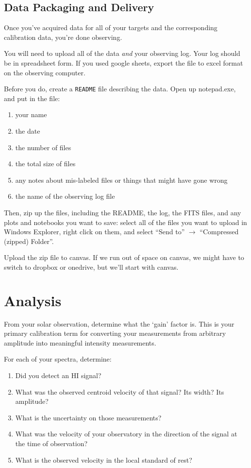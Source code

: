 \documentclass[11pt]{article}
\begin{document}
\subsection{Data Packaging and Delivery}
Once you've acquired data for all of your targets and the corresponding calibration data, you're done observing.

You will need to upload all of the data \emph{and} your observing log.
Your log should be in spreadsheet form.  If you used
google sheets, export the file to excel format on the observing computer.

Before you do, create a \texttt{README} file describing the data.  Open up notepad.exe,
and put in the file:
\begin{enumerate}
    \item your name
    \item the date
    \item the number of files
    \item the total size of files
    \item any notes about mis-labeled files or things that might have gone wrong
    \item the name of the observing log file
\end{enumerate}

Then, zip up the files, including the README, the log, the FITS files, and any plots
and notebooks you want to save:
select all of the files you want to upload in Windows Explorer, right click on
them, and select ``Send to'' $\rightarrow$ ``Compressed (zipped) Folder''.

Upload the zip file to canvas.  If we run out of space on canvas, we might have
to switch to dropbox or onedrive, but we'll start with canvas.


\section{Analysis}

From your solar observation, determine what the `gain' factor is.  This is your primary
calibration term for converting your measurements from arbitrary amplitude into meaningful
intensity measurements.

For each of your spectra, determine:
\begin{enumerate}
    \item Did you detect an HI signal?
    \item What was the observed centroid velocity of that signal?  Its width?  Its amplitude?
    \item What is the uncertainty on those measurements?
    \item What was the velocity of your observatory in the direction of the signal
        at the time of observation?
    \item What is the observed velocity in the local standard of rest?
\end{enumerate}
\end{document}

